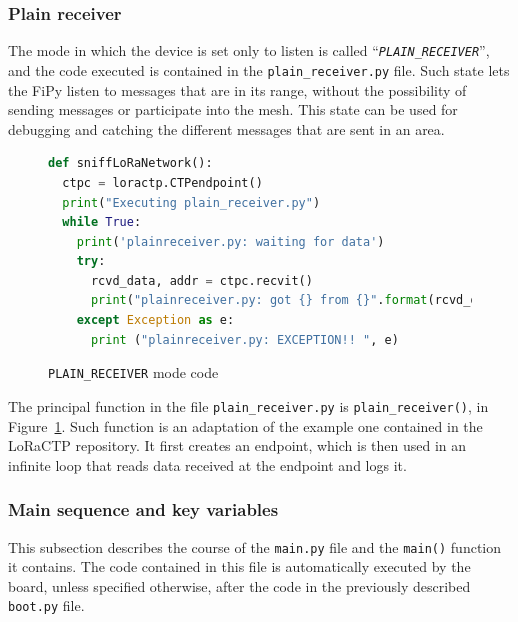 			\subsubsection{Plain receiver}
			
				The mode in which the device is set only to listen is called ``\textit{\texttt{PLAIN\_RECEIVER}}'', and the code executed is contained in the \texttt{plain\_receiver.py} file.
				Such state lets the FiPy listen to messages that are in its range, without the possibility of sending messages or participate into the mesh.
				This state can be used for debugging and catching the different messages that are sent in an area.
				
				\begin{figure}[H]
					\begin{lstlisting}[language=python]
def sniffLoRaNetwork():
  ctpc = loractp.CTPendpoint()
  print("Executing plain_receiver.py")
  while True:
    print('plainreceiver.py: waiting for data')
    try:
      rcvd_data, addr = ctpc.recvit()
      print("plainreceiver.py: got {} from {}".format(rcvd_data, addr))
    except Exception as e:
      print ("plainreceiver.py: EXCEPTION!! ", e)
					\end{lstlisting}
					\caption{\texttt{PLAIN\_RECEIVER} mode code}
					\label{code:plain_receiver}
				\end{figure}

				The principal function in the file \texttt{plain\_receiver.py} is \texttt{plain\_receiver()}, in Figure~\ref{code:plain_receiver}.
				Such function is an adaptation of the example one contained in the LoRaCTP repository.
				It first creates an endpoint, which is then used in an infinite loop that reads data received at the endpoint and logs it.
				
			\subsubsection{Main sequence and key variables}
			
				This subsection describes the course of the \texttt{main.py} file and the \texttt{main()} function it contains.
				The code contained in this file is automatically executed by the board, unless specified otherwise, after the code in the previously described \texttt{boot.py} file.
				
